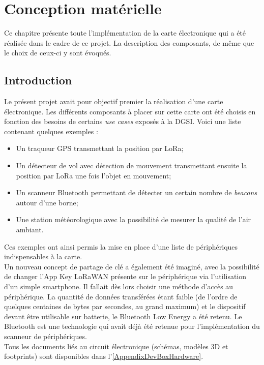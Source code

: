 \chapter{Conception matérielle}
\label{3_hardware}

Ce chapitre présente toute l'implémentation de la carte électronique qui a été réalisée dans le cadre de ce projet. La description des composants, de même que le choix de ceux-ci y sont évoqués.


\section{Introduction}

Le présent projet avait pour objectif premier la réalisation d'une carte électronique. Les différents composants à placer sur cette carte ont été choisis en fonction des besoins de certains \textit{use cases} exposés à la DGSI. Voici une liste contenant quelques exemples : 
\begin{itemize}
    \item Un traqueur GPS transmettant la position par LoRa;
    \item Un détecteur de vol avec détection de mouvement transmettant ensuite la position par LoRa une fois l'objet en mouvement;
    \item Un scanneur Bluetooth permettant de détecter un certain nombre de \textit{beacons} autour d'une borne;
    \item Une station météorologique avec la possibilité de mesurer la qualité de l'air ambiant.
\end{itemize}

Ces exemples ont ainsi permis la mise en place d'une liste de périphériques indispensables à la carte.\\

Un nouveau concept de partage de clé a également été imaginé, avec la possibilité de changer l’App Key LoRaWAN présente sur le périphérique via l'utilisation d'un simple smartphone. Il fallait dès lors choisir une méthode d'accès au périphérique. La quantité de données transférées étant faible (de l'ordre de quelques centaines de bytes par secondes, au grand maximum) et le dispositif devant être utilisable sur batterie, le Bluetooth Low Energy a été retenu. Le Bluetooth est une technologie qui avait déjà été retenue pour l'implémentation du scanneur de périphériques.\\

Tous les documents liés au circuit électronique (schémas, modèles 3D et footprints) sont disponibles dans l'\cref{AppendixDevBoxHardware}.

